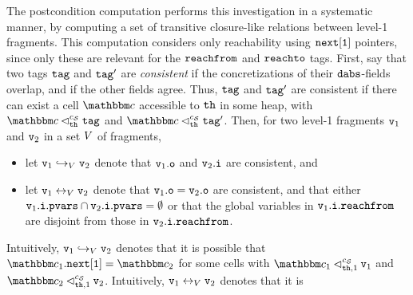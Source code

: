 The postcondition computation performs this investigation in a
systematic manner, by computing a set of transitive closure-like relations
between level-1 fragments. This computation considers only reachability
using $\tt next[1]$ pointers, since only these are relevant for the
$\mathtt{reachfrom}$ and $\mathtt{reachto}$ tags.
First, say that two tags
$\mathtt{tag}$ and $\mathtt{tag}'$ are {\em consistent} if the concretizations of their
$\mathtt{dabs}$-fields overlap, and if the other fields agree.
Thus, $\mathtt{tag}$ and $\mathtt{tag}'$ are consistent if there can exist a cell
$\cell$ accessible to ${\tt th}$ in some heap,
with $\cell \satfrag{\thread}{\sconf} \atag$
and $\cell \satfrag{\thread}{\sconf} \atag'$.
Then, for two level-1 fragments $\mathtt{v}_1$ and $\mathtt{v}_2$ in a
set $V$ of fragments,
\begin{itemize}
\item let $\mathtt{v}_1 \hookrightarrow_{V} \mathtt{v}_2$ denote that $\mathtt{v}_1.\mathtt{o}$   and $\mathtt{v}_2.\mathtt{i}$ are consistent, and
\item let $\mathtt{v}_1 \leftrightarrow_{V} \mathtt{v}_2$ denote that $\mathtt{v}_1.\mathtt{o} = \mathtt{v}_2.\mathtt{o}$ are consistent, and that either
  $\mathtt{v}_1.\mathtt{i}.\mathtt{pvars} \cap \mathtt{v}_2.\mathtt{i}.\mathtt{pvars} = \emptyset$ or that
  the global variables in  $\mathtt{v}_1.\mathtt{i}.\mathtt{reachfrom}$ are disjoint from
  those in $\mathtt{v}_2.\mathtt{i}.\mathtt{reachfrom}$.
\end{itemize}
Intuitively, $\mathtt{v}_1 \hookrightarrow_{V} \mathtt{v}_2$ denotes that it is
possible that  $\cell_1.{\tt next[1]} = \cell_2$ for some cells with
  $\cell_1 \lsatfrag{1}{{\thread}}{\sconf} \frag_1$ and
  $\cell_2 \lsatfrag{1}{{\thread}}{\sconf} \frag_2$.
Intuitively, $\mathtt{v}_1 \leftrightarrow_{V} \mathtt{v}_2$ denotes that it is

